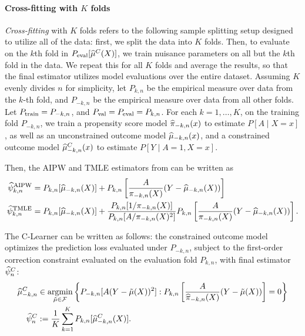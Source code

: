 \paragraph{Cross-fitting with $K$ folds}
\emph{Cross-fitting} with $K$ folds \citep{ChernozhukovChDeDuHaNeRo18} refers to the following sample splitting setup designed to utilize all of the data: 
first, we split the data into $K$ folds. Then, to evaluate on the $k$th fold in $P_{\rm eval}[\widehat{\mu}^C(X)]$, we train nuisance parameters on all but the $k$th fold in the data. We repeat this for all $K$ folds and average the results, so that the final estimator utilizes model evaluations over the entire dataset. 
Assuming $K$ evenly divides $n$ for simplicity, let $P_{k,n}$ be the empirical measure over data from the $k$-th fold, and $P_{-k,n}$ be the empirical measure over data from all other folds. 
Let $P_{\rm train}=P_{-k,n}$, and $P_{\rm val}=P_{\rm eval}=P_{k,n}$. 
For each $k=1,\ldots,K$, on the training fold $P_{-k, n}$, we train a propensity score model $\widehat{\pi}_{-k,n}(x)$ to estimate $P[A\mid X=x]$, as well as an unconstrained outcome model $\widehat{\mu}_{-k,n}(x)$, and a constrained outcome model $\widehat{\mu}_{-k,n}^C(x)$ to estimate $P[Y\mid A=1,X=x]$.  

Then, the AIPW and TMLE estimators from  can be written as 
\begin{align*}
   \widehat{\psi}^{\rm AIPW}_{k,n}&=P_{k,n}[\widehat{\mu}_{-k,n}(X)]+P_{k,n}\left[\frac{A}{\pi_{-k,n}(X)}(Y-\widehat{\mu}_{-k,n}(X))\right]\\ 
   \widehat{\psi}^{\rm TMLE}_{k,n}&=P_{k,n}[\widehat{\mu}_{-k,n}(X)]+\frac{P_{k,n}[1/\pi_{-k,n}(X)]}{P_{k,n}[A/\pi_{-k,n}(X)^2]}P_{k,n}\left[\frac{A}{\pi_{-k,n}(X)}(Y-\widehat{\mu}_{-k,n}(X))\right].
\end{align*}

The C-Learner can be written as follows: the constrained outcome model optimizes the prediction loss evaluated under $P_{-k, n}$,  subject to the first-order correction constraint evaluated on the evaluation fold $P_{k, n}$, with final estimator $\widehat{\psi}_n^C$:
\vspace{-0.3em}
\begin{align}
\label{eq:constraint}
\widehat{\mu}_{-k, n}^C 
&\in \mathop{\rm argmin}_{\tilde{\mu} \in \mathcal{F}}
\left\{ P_{-k, n} [ A (Y - \tilde{\mu}(X))^2]:
P_{k,n}\left[\frac{A}{\widehat{\pi}_{-k,n}(X)}(Y-\tilde{\mu}(X))\right]=0
\right\}\\
    \widehat{\psi}^C_n &:=\frac{1}{K}\sum_{k=1}^K P_{k,n}[\widehat{\mu}_{-k,n}^C(X)].
\label{eq:c_learner_def}
\end{align}

